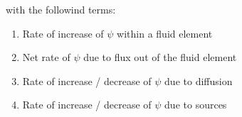 with the followind terms:

\renewcommand{\arraystretch}{0.9}
\begin{enumerate}
 \item Rate of increase of $\psi$ within a fluid element
 \item Net rate of $\psi$ due to flux out of the fluid element
 \item Rate of increase / decrease of $\psi$ due to diffusion
 \item Rate of increase / decrease of $\psi$ due to sources
\end{enumerate}
